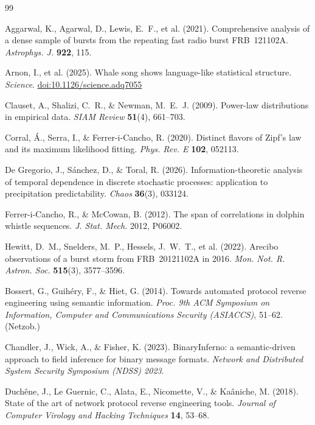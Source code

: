 \documentclass[11pt,a4paper]{article}
\providecommand{\doi}[1]{\href{https://doi.org/#1}{doi:#1}}
\begin{document}
\begin{thebibliography}{99}
\small

 Aggarwal, K., Agarwal, D., Lewis, E.~F., et al. (2021).
Comprehensive analysis of a dense sample of bursts from the repeating fast radio burst
FRB~121102A. \emph{Astrophys. J.} \textbf{922}, 115.

 Arnon, I., et al. (2025). Whale song shows language-like statistical
structure. \emph{Science}. \doi{10.1126/science.adq7055}

 Clauset, A., Shalizi, C.~R., \& Newman, M.~E.~J. (2009).
Power-law distributions in empirical data. \emph{SIAM Review} \textbf{51}(4), 661--703.

 Corral, \'A., Serra, I., \& Ferrer-i-Cancho, R. (2020). Distinct
flavors of Zipf's law and its maximum likelihood fitting. \emph{Phys. Rev. E}
\textbf{102}, 052113.

 De Gregorio, J., S\'anchez, D., \& Toral, R. (2026).
Information-theoretic analysis of temporal dependence in discrete stochastic
processes: application to precipitation predictability. \emph{Chaos} \textbf{36}(3),
033124.

 Ferrer-i-Cancho, R., \& McCowan, B. (2012). The span of
correlations in dolphin whistle sequences. \emph{J. Stat. Mech.} 2012, P06002.

 Hewitt, D.~M., Snelders, M.~P., Hessels, J.~W.~T., et al. (2022).
Arecibo observations of a burst storm from FRB~20121102A in 2016. \emph{Mon. Not. R.
Astron. Soc.} \textbf{515}(3), 3577--3596.

 Bossert, G., Guih\'ery, F., \& Hiet, G. (2014). Towards automated
protocol reverse engineering using semantic information. \emph{Proc. 9th ACM Symposium
on Information, Computer and Communications Security (ASIACCS)}, 51--62. (Netzob.)

 Chandler, J., Wick, A., \& Fisher, K. (2023). BinaryInferno: a
semantic-driven approach to field inference for binary message formats. \emph{Network
and Distributed System Security Symposium (NDSS) 2023}.

 Duchêne, J., Le Guernic, C., Alata, E., Nicomette, V., \&
Kaâniche, M. (2018). State of the art of network protocol reverse engineering tools.
\emph{Journal of Computer Virology and Hacking Techniques} \textbf{14}, 53--68.


\end{thebibliography}
\end{document}
